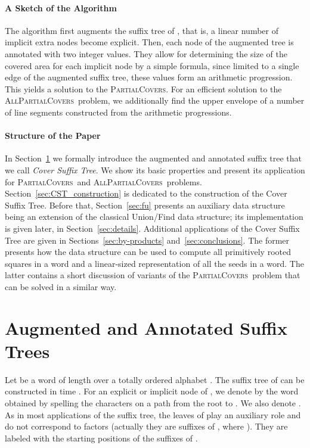 \documentclass{article}
\theoremstyle{theorem}
\theoremstyle{definition}
\newcommand{\PC}{{\textsc{PartialCovers}}}
\newcommand{\APC}{{\textsc{AllPartialCovers}}}
\begin{document}
    \paragraph{\bf A Sketch of the Algorithm}
    The algorithm first augments the suffix tree of , that is, a linear number of implicit
    extra nodes become explicit.
    Then, each node of the augmented tree is annotated with two integer values.
    They allow for determining the size of the covered area 
    for each implicit node by a simple formula, since limited to a single edge of the augmented suffix tree,
    these values form an arithmetic progression.
    This yields a solution to the \PC.
    For an efficient solution to the \APC\ problem, we additionally
    find the upper envelope of a number of line segments constructed from the arithmetic progressions.
    
    \paragraph{\bf Structure of the Paper}
    In Section~\ref{sec:CST} we formally introduce the augmented and annotated suffix tree
    that we call \emph{Cover Suffix Tree}.
    We show its basic properties and present its application for \PC\
    and \APC\ problems.
    Section~\ref{sec:CST_construction} is dedicated to the construction
    of the Cover Suffix Tree.
    Before that, Section~\ref{sec:fu} presents an auxiliary data structure being an extension
    of the classical Union/Find data structure; its implementation is given later, in Section~\ref{sec:details}.
    Additional applications of the Cover Suffix Tree are given in Sections~\ref{sec:by-products}
    and~\ref{sec:conclusions}.
    The former presents how the data structure can be used to compute all primitively rooted squares
    in a word and a linear-sized representation of all the seeds in a word.
    The latter contains a short discussion of variants of the \PC\ problem
    that can be solved in a similar way.


  \section{Augmented and Annotated Suffix Trees}\label{sec:CST}
  Let  be a word of length  over a totally ordered alphabet .
  The suffix tree  of  can be constructed in  time
  \cite{DBLP:conf/focs/Farach97,DBLP:journals/algorithmica/Ukkonen95}.
  For an explicit or implicit node  of , we denote by  the word obtained by spelling
  the characters on a path from the root to .
  We also denote .
  As in most applications of the suffix tree,
  the leaves of  play an auxiliary role and do not correspond to factors
  (actually they are suffixes of , where ).
  They are labeled with the starting positions of the suffixes of .
\end{document}
